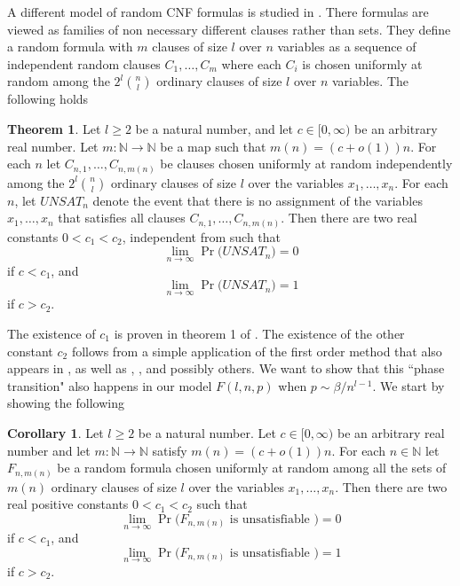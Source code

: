 \documentclass[12pt,notitlepage,a4paper]{article}
\theoremstyle{definition}
\newtheorem{theorem}{Theorem}[section]
\newtheorem{corollary}{Corollary}[section]
\newcommand{\N}{\mathbb{N}}
\newcommand{\Ln}{\lim\limits_{n\to \infty}}
\begin{document}
A different model of random CNF formulas is studied in \cite{chvatal1992mick}. There 
formulas are viewed as families of non necessary different clauses rather than sets.
They define a random formula with $m$ clauses of size $l$ over $n$ variables as
a sequence of independent 
random clauses $C_1,\dots, C_m$ where each $C_i$ is chosen uniformly at random among
the $2^l \binom{n}{l}$ ordinary clauses of size $l$ over $n$ variables. The 
following holds
\begin{theorem} 
Let $l\geq 2$ be a natural number, and let $c\in [0,\infty)$ 
be an arbitrary real number. 
Let $m:\N\rightarrow \N$ be a map such that
$m(n)=(c+o(1))n$. For each $n$ let $C_{n,1},\dots, C_{n,m(n)}$
be clauses chosen uniformly at random independently among the 
$2^l \binom{n}{l}$ ordinary clauses of size $l$ over the
variables $x_1,\dots, x_n$. For each $n$, let $UNSAT_n$
denote the event that there is no assignment of the variables
$x_1,\dots,x_n$ that satisfies all clauses $C_{n,1},\dots, C_{n,m(n)}$. 
Then there are two real constants $0<c_1<c_2$, independent from such that 
\[
\Ln \Pr\big( UNSAT_n \big)=0
\]
if $c< c_1$, and 
\[
\Ln \Pr\big( UNSAT_n \big)=1
\]
if $c> c_2$. 
\end{theorem}
The existence of $c_1$ is proven in theorem 1 of \cite{chvatal1992mick}. 
The existence of the other constant $c_2$ follows from a simple application of
the first order method that also appears in \cite{chvatal1992mick}, as well as 
\cite{franco1983probabilistic}, \cite{chvatal1988many}, \cite{simon1986etude}
and possibly others. We want to show that this ``phase transition" also happens in
our model $F(l,n,p)$ when $p\sim \beta/n^{l-1}$. We start by showing the following
\begin{corollary}
	Let $l\geq 2$ be a natural number. Let $c\in [0,\infty)$ be an arbitrary
	real number and let $m:\N\rightarrow \N$ satisfy $m(n)=(c+o(1))n$. 
	For each $n\in \N$ let $F_{n,m(n)}$ be a random formula chosen uniformly at
	random among all the sets of $m(n)$ ordinary clauses of size $l$ over
	the variables $x_1,\dots, x_n$. Then there
	are two real positive constants $0<c_1<c_2$ such that
	\[
	\Ln \Pr \big( F_{n,m(n)} \text{ is unsatisfiable } \big)=0
	\]
	if $c< c_1$, and
	\[
	\Ln \Pr \big( F_{n,m(n)} \text{ is unsatisfiable } \big)=1
	\]
	if $c> c_2$.
\end{corollary}
\end{document}
